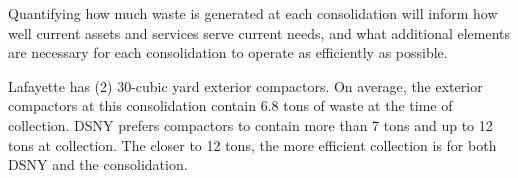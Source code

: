 
    Quantifying how much waste is generated at each consolidation will inform how well current assets and services serve current needs, and what additional elements are necessary for each consolidation to operate as efficiently as possible.
    
    Lafayette has (2) 30-cubic yard exterior compactors. On average, the exterior compactors at this consolidation contain 6.8 tons of waste at the time of collection. DSNY prefers compactors to contain more than 7 tons and up to 12 tons at collection. The closer to 12 tons, the more efficient collection is for both DSNY and the consolidation.